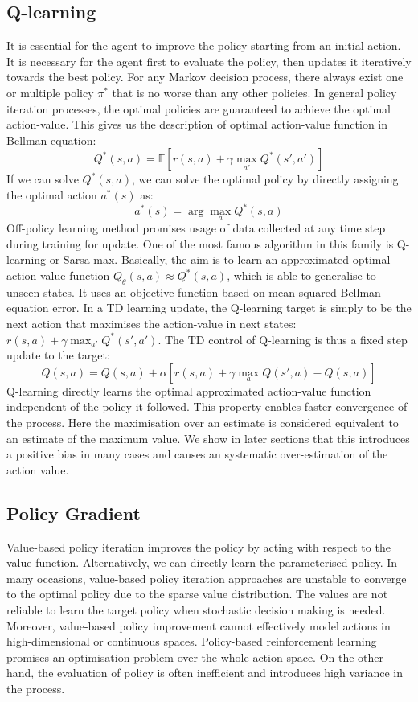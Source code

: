 \documentclass[oneside,11pt,a4paper]{article}
\begin{document}
\subsection{Q-learning}
It is essential for the agent to improve the policy starting from an initial action. It is necessary for the agent first to evaluate the policy, then updates it iteratively towards the best policy. For any Markov decision process, there always exist one or multiple policy $\pi^*$ that is no worse than any other policies. In general policy iteration processes, the optimal policies are guaranteed to achieve the optimal action-value. This gives us the description of optimal action-value function in Bellman equation:
$$
Q^*(s,a) = \mathbb E[r(s,a) + \gamma\max_{a'} Q^*(s',a')]
$$
If we can solve $Q^*(s,a)$, we can solve the optimal policy by directly assigning the optimal action $a^*(s)$ as:
$$
a^*(s) = \arg\max_aQ^*(s,a)
$$
Off-policy learning method promises usage of data collected at any time step during training for update. One of the most famous algorithm in this family is Q-learning or Sarsa-max. Basically, the aim is to learn an approximated optimal action-value function $Q_\theta(s,a)\approx Q^*(s,a)$, which is able to generalise to unseen states. It uses an objective function based on mean squared Bellman equation error. In a TD learning update, the Q-learning target is simply to be the next action that maximises the action-value in next states: $r(s,a) + \gamma\max_{a'} Q^*(s',a')$. The TD control of Q-learning is thus a fixed step update to the target:
$$
Q(s,a) = Q(s,a) +\alpha[r(s,a)+\gamma\max_a Q(s',a) - Q(s,a)]
$$
Q-learning directly learns the optimal approximated action-value function independent of the policy it followed. This property enables faster convergence of the process. Here the maximisation over an estimate is considered equivalent to an estimate of the maximum value. We show in later sections that this introduces a positive bias in many cases and causes an systematic over-estimation of the action value.
\newline
\newline
\noindent
\subsection{Policy Gradient}
Value-based policy iteration improves the policy by acting with respect to the value function. Alternatively, we can directly learn the parameterised policy. In many occasions, value-based policy iteration approaches are unstable to converge to the optimal policy due to the sparse value distribution. The values are not reliable to learn the target policy when stochastic decision making is needed. Moreover, value-based policy improvement cannot effectively model actions in high-dimensional or continuous spaces. Policy-based reinforcement learning promises an optimisation problem over the whole action space. On the other hand, the evaluation of policy is often inefficient and introduces high variance in the process.
\end{document}
